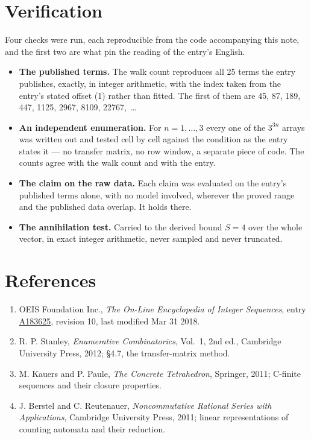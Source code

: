 \documentclass[11pt]{article}
\theoremstyle{definition}
\begin{document}
\section{Verification}

Four checks were run, each reproducible from the code accompanying this note, and the first two are what pin the reading of the entry's English.

\begin{itemize}

\item {\bfseries The published terms.} The walk count reproduces all 25 terms the entry publishes, exactly, in integer arithmetic, with the index taken from the entry's stated offset (1) rather than fitted. The first of them are 45, 87, 189, 447, 1125, 2967, 8109, 22767,~\dots

\item {\bfseries An independent enumeration.} For $n = 1,\dots,3$ every one of the $3^{3n}$ arrays was written out and tested cell by cell against the condition as the entry states it --- no transfer matrix, no row window, a separate piece of code. The counts agree with the walk count and with the entry.

\item {\bfseries The claim on the raw data.} Each claim was evaluated on the entry's published terms alone, with no model involved, wherever the proved range and the published data overlap. It holds there.

\item {\bfseries The annihilation test.} Carried to the derived bound $S = 4$ over the whole vector, in exact integer arithmetic, never sampled and never truncated.

\end{itemize}

\section{References}

\begin{enumerate}

\item OEIS Foundation Inc., \emph{The On-Line Encyclopedia of Integer Sequences}, entry \href{https://oeis.org/A183625}{A183625}, revision 10, last modified Mar 31 2018.

\item R. P. Stanley, \emph{Enumerative Combinatorics}, Vol.~1, 2nd ed., Cambridge University Press, 2012; \S4.7, the transfer-matrix method.

\item M. Kauers and P. Paule, \emph{The Concrete Tetrahedron}, Springer, 2011; C-finite sequences and their closure properties.

\item J. Berstel and C. Reutenauer, \emph{Noncommutative Rational Series with Applications}, Cambridge University Press, 2011; linear representations of counting automata and their reduction.

\end{enumerate}
\end{document}
